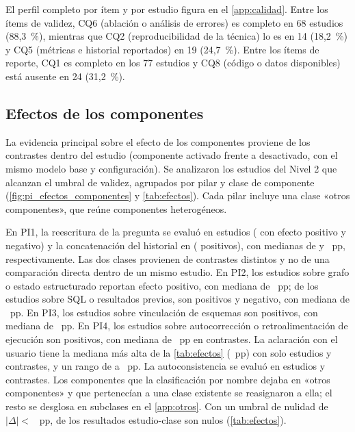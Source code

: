 El perfil completo por ítem y por estudio figura en el \cref{app:calidad}. Entre los ítems de validez, CQ6 (ablación o análisis de errores) es completo en 68 estudios (88,3~\%), mientras que CQ2 (reproducibilidad de la técnica) lo es en 14 (18,2~\%) y CQ5 (métricas e historial reportados) en 19 (24,7~\%). Entre los ítems de reporte, CQ1 es completo en los 77 estudios y CQ8 (código o datos disponibles) está ausente en 24 (31,2~\%).

\subsection{Efectos de los componentes}
\label{sec:res-efectos}





La evidencia principal sobre el efecto de los componentes proviene de los contrastes dentro del estudio (componente activado frente a desactivado, con el mismo modelo base y configuración). Se analizaron los \nUmbral{} estudios del Nivel 2 que alcanzan el umbral de validez, agrupados por pilar y clase de componente (\cref{fig:pi_efectos_componentes} y \cref{tab:efectos}). Cada pilar incluye una clase «otros componentes», que reúne componentes heterogéneos.

En PI1, la reescritura de la pregunta se evaluó en \efReescN{} estudios (\efReescPos{} con efecto positivo y \efReescNeg{} negativo) y la concatenación del historial en \efConcatN{} (\efConcatPos{} positivos), con medianas de \efReescMed{} y \efConcatMed{}~pp, respectivamente. Las dos clases provienen de contrastes distintos y no de una comparación directa dentro de un mismo estudio. En PI2, los \efGrafoN{} estudios sobre grafo o estado estructurado reportan efecto positivo, con mediana de \efGrafoMed{}~pp; de los \efSQLPrevN{} estudios sobre SQL o resultados previos, \efSQLPrevPos{} son positivos y \efSQLPrevNeg{} negativo, con mediana de \efSQLPrevMed{}~pp. En PI3, los \efVincN{} estudios sobre vinculación de esquemas son positivos, con mediana de \efVincMed{}~pp. En PI4, los \efAutocorrN{} estudios sobre autocorrección o retroalimentación de ejecución son positivos, con mediana de \efAutocorrMed{}~pp en \efAutocorrContr{} contrastes. La aclaración con el usuario tiene la mediana más alta de la \cref{tab:efectos} (\efAclarMed{}~pp) con solo \efAclarN{} estudios y \efAclarContr{} contrastes, y un rango de \efAclarMin{} a \efAclarMax{}~pp. La autoconsistencia se evaluó en \efAutoconsN{} estudios y \efAutoconsContr{} contrastes. Los componentes que la clasificación por nombre dejaba en «otros componentes» y que pertenecían a una clase existente se reasignaron a ella; el resto se desglosa en subclases en el \cref{app:otros}. Con un umbral de nulidad de $|\Delta| <$ \umbralNulo{}~pp, \nulosUmbral{} de los \nEstClase{} resultados estudio-clase son nulos (\cref{tab:efectos}).

